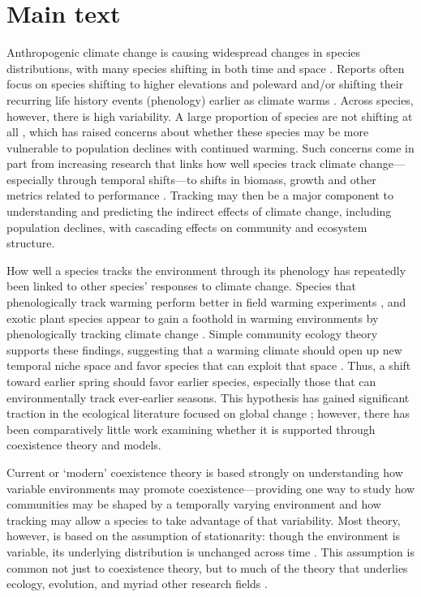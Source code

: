 \documentclass[11pt,letterpaper]{article}
\begin{document}
\newpage

\section{Main text}
Anthropogenic climate change is causing widespread changes in species distributions, with many species shifting in both time and space \citep{IPCC:2014sm}. Reports often focus on species shifting to higher elevations and poleward \citep{Chen2011} and/or shifting their recurring life history events (phenology) earlier as climate warms \citep{Wolkovich:2012n,cohen2018}. Across species, however, there is high variability. A large proportion of species are not shifting at all \citep{Cook:2012pnas}, which has raised concerns about whether these species may be more vulnerable to population declines with continued warming. Such concerns come in part from increasing research that links how well species track climate change---especially through temporal shifts---to shifts in biomass, growth and other metrics related to performance \citep{Cleland:2012}. Tracking may then be a major component to understanding and predicting the indirect effects of climate change, including population declines, with cascading effects on community and ecosystem structure.

How well a species tracks the environment through its phenology has repeatedly been linked to other species' responses to climate change. Species that phenologically track warming perform better in field warming experiments \citep{Cleland:2012}, and exotic plant species appear to gain a foothold in warming environments by phenologically tracking climate change \citep{Willis:2010al}. Simple community ecology theory supports these findings, suggesting that a warming climate should open up new temporal niche space and favor species that can exploit that space \citep{gotelli1996,wolkovich:2010fee,Zettlemoyer2019}. Thus, a shift toward earlier spring should favor earlier species, especially those that can environmentally track ever-earlier seasons. This hypothesis has gained significant traction in the ecological literature focused on global change \citep[e.g.,][]{Cleland:2012}; however, there has been comparatively little work examining whether it is supported through coexistence theory and models. %

Current or `modern' coexistence theory is based strongly on understanding how variable environments may promote coexistence---providing one way to study how communities may be shaped by a temporally varying environment and how tracking may allow a species to take advantage of that variability. Most theory, however, is based on the assumption of stationarity: though the environment is variable, its underlying distribution is unchanged across time \citep[i.e., constant mean and variance,][]{barabas2018}. This assumption is common not just to coexistence theory, but to much of the theory that underlies ecology, evolution, and myriad other research fields \citep[e.g.,][]{Milly:2008yu,nosenko2013}. 
\end{document}
